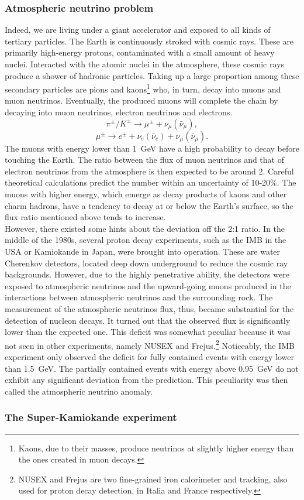 \subsubsection{Atmospheric neutrino problem}
Indeed, we are living under a giant accelerator and exposed to all kinds of tertiary particles. The Earth is continuously stroked with cosmic rays. These are primarily high-energy protons, contaminated with a small amount of heavy nuclei. Interacted with the atomic nuclei in the atmosphere, these cosmic rays produce a shower of hadronic particles. Taking up a large proportion among these secondary particles are pions and kaons\footnote{Kaons, due to their masses, produce neutrinos at slightly higher energy than the ones created in muon decays.} who, in turn, decay into muons and muon neutrinos. Eventually, the produced muons will complete the chain by decaying into muon neutrinos, electron neutrinos and electrons.
\begin{equation}
	\label{eq:piKdecay}
	\pi^\pm/K^\pm \rightarrow \mu^\pm + \nu_\mu (\bar{\nu}_\mu),
\end{equation}
\begin{equation}
	\label{eq:mudecay}
	\mu^\pm \rightarrow e^\pm + \nu_e (\bar{\nu}_e) + \nu_\mu (\bar{\nu}_\mu).
\end{equation}
The muons with energy lower than 1~GeV have a high probability to decay before touching the Earth. The ratio between the flux of muon neutrinos and that of electron neutrinos from the atmosphere is then expected to be around 2. Careful theoretical calculations predict the number within an uncertainty of 10-20\%. The muons with higher energy, which emerge as decay products of kaons and other charm hadrons, have a tendency to decay at or below the Earth's surface, so the  flux ratio mentioned above tends to increase. \\

However, there existed some hints about the deviation off the 2:1 ratio. In the middle of the 1980s, several proton decay experiments, such as the IMB in the USA or Kamiokande in Japan, were brought into operation. These are water Cherenkov detectors, located deep down underground to reduce the cosmic ray backgrounds. However, due to the highly penetrative ability, the detectors were exposed to atmospheric neutrinos and the upward-going muons produced in the interactions between atmospheric neutrinos and the surrounding rock. The measurement of the atmospheric neutrinos flux, thus, became substantial for the detection of nucleon decays. It turned out that the observed flux is significantly lower than the expected one. This deficit was somewhat peculiar because it was not seen in other experiments, namely NUSEX and Frejus.\footnote{NUSEX and Frejus are two fine-grained iron calorimeter and tracking, also used for proton decay detection, in Italia and France respectively.} Noticeably, the IMB experiment only observed the deficit for fully contained events with energy lower than 1.5~GeV. The partially contained events with energy above 0.95~GeV do not exhibit any significant deviation from the prediction. This peculiarity was then called the atmospheric neutrino anomaly.\\

\subsubsection{The Super-Kamiokande experiment}


	